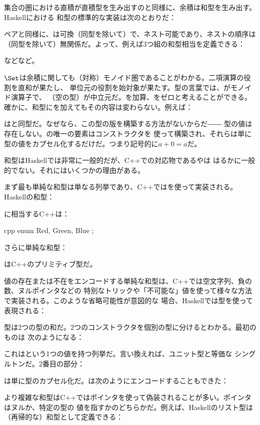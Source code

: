 集合の圏における直積が直積型を生み出すのと同様に、余積は和型を生み出す。Haskellにおける
和型の標準的な実装は次のとおりだ：

ペアと同様に、は可換（同型を除いて）で、ネスト可能であり、ネストの順序は
（同型を除いて）無関係だ。よって、例えば3つ組の和型相当を定義できる：

などなど。

$\Set$は余積に関しても（対称）モノイド圏であることがわかる。二項演算の役割を直和が果たし、
単位元の役割を始対象が果たす。型の言葉では、がモノイド演算子で、
（空の型）が中立元だ。を加算、をゼロと考えることができる。
確かに、和型にを加えてもその内容は変わらない。例えば：

はと同型だ。なぜなら、この型の版を構築する方法がないからだ――
型の値は存在しない。の唯一の要素はコンストラクタを
使って構築され、それらは単に型の値をカプセル化するだけだ。つまり記号的に$a + 0 = a$だ。

和型はHaskellでは非常に一般的だが、C++での対応物であるやは
はるかに一般的でない。それにはいくつかの理由がある。

まず最も単純な和型は単なる列挙であり、C++ではを使って実装される。Haskellの和型：

に相当するC++は：

\begin{snip}{cpp}
enum { Red, Green, Blue };
\end{snip}
さらに単純な和型：

はC++のプリミティブ型だ。

値の存在または不在をエンコードする単純な和型は、C++では空文字列、負の数、ヌルポインタなどの
特別なトリックや「不可能な」値を使って様々な方法で実装される。このような省略可能性が意図的な
場合、Haskellでは型を使って表現される：

型は2つの型の和だ。2つのコンストラクタを個別の型に分けるとわかる。最初のものは
次のようになる：

これはという1つの値を持つ列挙だ。言い換えれば、ユニット型\code{()}と等価な
シングルトンだ。2番目の部分：

は単に型のカプセル化だ。は次のようにエンコードすることもできた：

より複雑な和型はC++ではポインタを使って偽装されることが多い。ポインタはヌルか、特定の型の
値を指すかのどちらかだ。例えば、Haskellのリスト型は（再帰的な）和型として定義できる：

